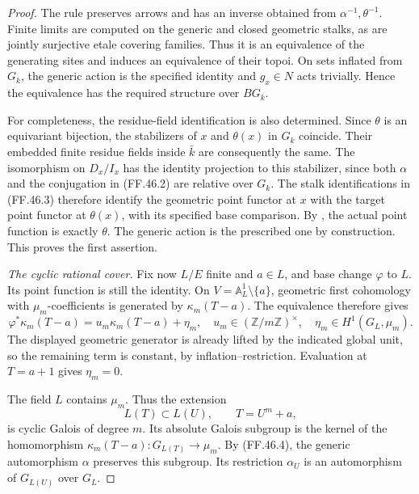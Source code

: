 \begin{proof}
The rule preserves arrows and has an inverse obtained
from \(\alpha^{-1},\theta^{-1}\). Finite limits are
computed on the generic and closed geometric stalks, as
are jointly surjective etale covering families. Thus it
is an equivalence of the generating sites and induces
an equivalence of their topoi. On sets inflated from
\(G_k\), the generic action is the specified identity
and \(g_x\in N\) acts trivially. Hence the equivalence
has the required structure over \(BG_k\).

For completeness, the residue-field identification is
also determined. Since \(\theta\) is an equivariant
bijection, the stabilizers of \(x\) and \(\theta(x)\)
in \(G_k\) coincide. Their embedded finite residue
fields inside \(\bar k\) are consequently the same.
The isomorphism on \(D_x/I_x\) has the identity
projection to this stabilizer, since both \(\alpha\)
and the conjugation in (FF.46.2) are relative over
\(G_k\). The stalk identifications in (FF.46.3)
therefore identify the geometric point functor at \(x\)
with the target point functor at \(\theta(x)\), with
its specified base comparison. By
\citet[Proposition~3.6]{FF_CHW2024}, the actual point
function is exactly \(\theta\). The generic action
is the prescribed one by construction. This proves the
first assertion.

\emph{The cyclic rational cover.}
Fix now \(L/E\) finite and \(a\in L\), and base
change \(\varphi\) to \(L\). Its point function is
still the identity. On
\(V=\mathbb A^1_L\setminus\{a\}\), geometric first
cohomology with \(\mu_m\)-coefficients is generated
by \(\kappa_m(T-a)\). The equivalence therefore gives
\[
 \varphi^*\kappa_m(T-a)
       =u_m\kappa_m(T-a)+\eta_m,
 \quad u_m\in(\mathbb Z/m\mathbb Z)^\times,
 \quad\eta_m\in H^1(G_L,\mu_m).
                                                        \tag{FF.46.4}
\]
The displayed geometric generator is already lifted by
the indicated global unit, so the remaining term is
constant, by inflation--restriction. Evaluation at
\(T=a+1\) gives \(\eta_m=0\).

The field \(L\) contains \(\mu_m\). Thus the
extension
\[
              L(T)\subset L(U),\qquad T=U^m+a,
                                                        \tag{FF.46.5}
\]
is cyclic Galois of degree \(m\). Its absolute Galois
subgroup is the kernel of the homomorphism
\(\kappa_m(T-a):G_{L(T)}\to\mu_m\).
By (FF.46.4), the generic automorphism \(\alpha\)
preserves this subgroup. Its restriction
\(\alpha_U\) is an automorphism of \(G_{L(U)}\)
over \(G_L\).


\end{proof}
